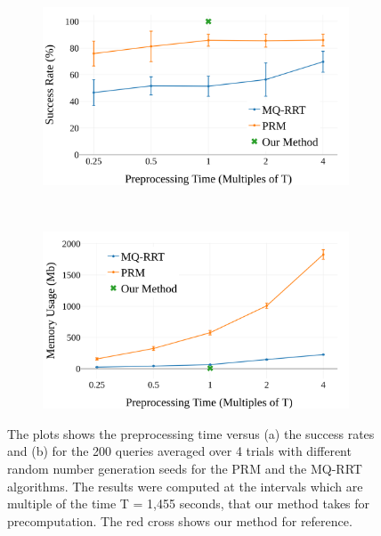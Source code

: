 \documentclass[letterpaper]{article} %
\begin{document}
\begin{figure}
    \centering
    \begin{subfigure}[b]{0.45\textwidth}
        \includegraphics[width=\textwidth]{success.png}
        \caption{}
        \label{fig:success}
    \end{subfigure}
    ~ %
    \begin{subfigure}[b]{0.45\textwidth}
        \includegraphics[width=\textwidth]{memory.png}
        \caption{}
        \label{fig:memory}
    \end{subfigure}
    \caption{The plots shows the preprocessing time versus (a) the success rates and (b) for the 200 queries averaged over 4 trials with different random number generation seeds for the PRM and the MQ-RRT algorithms. The results were computed at the intervals which are multiple of the time T = 1,455 seconds, that our method takes for precomputation. The red cross shows our method for reference.}
\end{figure}
\end{document}
